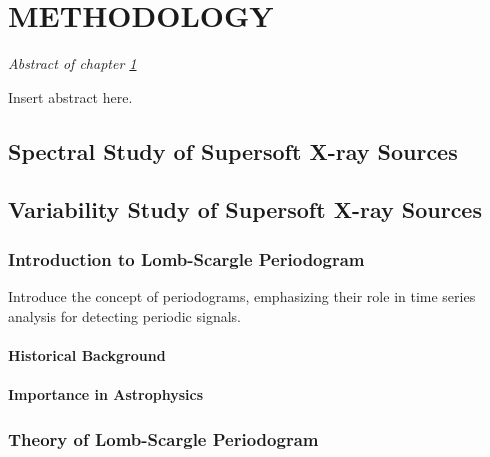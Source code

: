 \chapter{METHODOLOGY} \label{chap:methodology}
    \minitoc
    
    \newpage
    \begin{center}
    	\emph{Abstract of chapter \ref{chap:methodology}}
    \end{center}
    
    Insert abstract here.
    
    \section{Spectral Study of Supersoft X-ray Sources} \label{methodology:spectral}
    	
    	
    \section{Variability Study of Supersoft X-ray Sources} \label{methodology:variability}
    
    	\subsection{Introduction to Lomb-Scargle Periodogram}
    		Introduce the concept of periodograms, emphasizing their role in time series analysis for detecting periodic signals.
    		
    		\subsubsection{Historical Background}
    		
    		\subsubsection{Importance in Astrophysics}
    	
    	\subsection{Theory of Lomb-Scargle Periodogram}
    	
